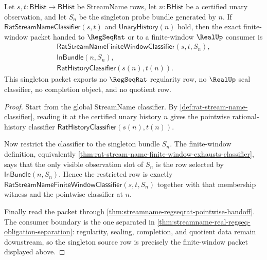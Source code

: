 \begin{theorem}
\label{thm:streamname-regseqrat-singleton-diagonal-handoff}
Let $s,t:\mathsf{BHist}\to\mathsf{BHist}$ be StreamName rows, let
$n:\mathsf{BHist}$ be a certified unary observation, and let $S_n$ be the
singleton probe bundle generated by $n$. If
$\mathsf{RatStreamNameClassifier}(s,t)$ and $\mathsf{UnaryHistory}(n)$ hold,
then the exact finite-window packet handed to $\RegSeqRat$ or to a
finite-window $\RealUp$ consumer is
$$
\begin{gathered}
\mathsf{RatStreamNameFiniteWindowClassifier}(s,t,S_n),\\
\mathsf{InBundle}(n,S_n),\\
\mathsf{RatHistoryClassifier}(s(n),t(n)).
\end{gathered}
$$
This singleton packet exports no $\RegSeqRat$ regularity row, no $\RealUp$
seal classifier, no completion object, and no quotient row.
\end{theorem}
\begin{proof}
Start from the global StreamName classifier. By
\autoref{def:rat-stream-name-classifier}, reading it at the certified unary
history $n$ gives the pointwise rational-history classifier
$\mathsf{RatHistoryClassifier}(s(n),t(n))$.

Now restrict the classifier to the singleton bundle $S_n$. The finite-window
definition, equivalently
\autoref{thm:rat-stream-name-finite-window-exhausts-classifier}, says that
the only visible observation slot of $S_n$ is the row selected by
$\mathsf{InBundle}(n,S_n)$. Hence the restricted row is exactly
$\mathsf{RatStreamNameFiniteWindowClassifier}(s,t,S_n)$ together with that
membership witness and the pointwise classifier at $n$.

Finally read the packet through
\autoref{thm:streamname-regseqrat-pointwise-handoff}. The consumer boundary is
the one separated in
\autoref{thm:streamname-real-regseq-obligation-separation}: regularity,
sealing, completion, and quotient data remain downstream, so the singleton
source row is precisely the finite-window packet displayed above.
\end{proof}


